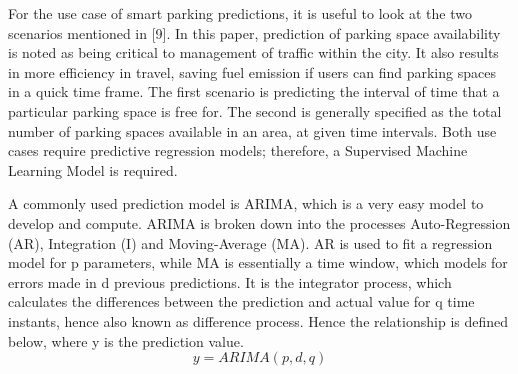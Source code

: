 For the use case of smart parking predictions, it is useful to look at the two scenarios mentioned in [9]. In this paper, prediction of parking space availability is noted as being critical to management of traffic within the city. It also results in more efficiency in travel, saving fuel emission if users can find parking spaces in a quick time frame. The first scenario is predicting the interval of time that a particular parking space is free for. The second is generally specified as the total number of parking spaces available in an area, at given time intervals. Both use cases require  predictive regression models; therefore, a Supervised Machine Learning Model is required.  

 

A commonly used prediction model is ARIMA, which is a very easy model to develop and compute. ARIMA is broken down into the processes Auto-Regression (AR), Integration (I) and Moving-Average (MA).  AR is used to fit a regression model for p parameters, while MA is essentially a time window, which models for errors made in d previous predictions. It is the integrator process, which calculates the differences between the prediction and actual value for q time instants, hence also known as difference process.  Hence the relationship is defined below, where y is the prediction value.  
\begin{equation}
    y= ARIMA(p,d,q)
\end{equation}

